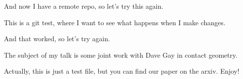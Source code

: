 \documentclass[11pt]{amsart}
\theoremstyle{plain}
\theoremstyle{definition}
\theoremstyle{remark}
\numberwithin{equation}{section}
\begin{document}
And now I have a remote repo, so let's try this again.

This is a git test, where I want to see what happens when I make changes.

And that worked, so let's try again.

The subject of my talk is some joint work with Dave Gay in contact geometry.

Actually, this is just a test file, but you can find our paper on the arxiv. Enjoy!
\end{document}
